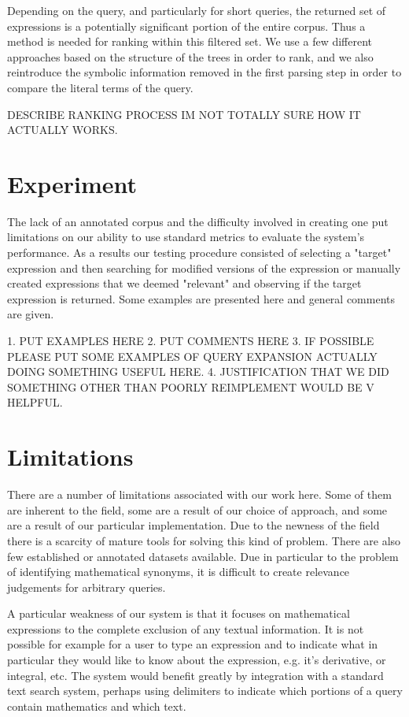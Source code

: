 \documentclass{sig-alternate}
\begin{document}
Depending on the query, and particularly for short queries, the returned set of expressions is a potentially
significant portion of the entire corpus. Thus a method is needed for ranking within this filtered set. We 
use a few different approaches based on the structure of the trees in order to rank, and we also reintroduce
the symbolic information removed in the first parsing step in order to compare the literal terms of the query.

DESCRIBE RANKING PROCESS IM NOT TOTALLY SURE HOW IT ACTUALLY WORKS.

\section{Experiment}
The lack of an annotated corpus and the difficulty involved in creating one put limitations on our ability
to use standard metrics to evaluate the system's performance. As a results our testing procedure consisted of
selecting a "target" expression and then searching for modified versions of the expression or manually created expressions that we deemed "relevant" and observing if the target expression is returned. Some examples are presented here and general comments are given. 

1. PUT EXAMPLES HERE
2. PUT COMMENTS HERE
3. IF POSSIBLE PLEASE PUT SOME EXAMPLES OF QUERY EXPANSION ACTUALLY DOING SOMETHING USEFUL HERE.
4. JUSTIFICATION THAT WE DID SOMETHING OTHER THAN POORLY REIMPLEMENT WOULD BE V HELPFUL.

\section{Limitations}
There are a number of limitations associated with our work here. Some of them are inherent to the field,
some are a result of our choice of approach, and some are a result of our particular implementation. Due to the newness
of the field there is a scarcity of mature tools for solving this kind of problem. There are also few 
established or annotated datasets available. Due in particular to the problem of identifying mathematical
synonyms, it is difficult to create relevance judgements for arbitrary queries. 

A particular weakness of our system is that it focuses on mathematical expressions to the complete exclusion
of any textual information. It is not possible for example for a user to type an expression and to indicate what
in particular they would like to know about the expression, e.g. it's derivative, or integral, etc. The system would benefit greatly by integration with a standard text search system, perhaps using delimiters to indicate which portions
of a query contain mathematics and which text.
\end{document}
